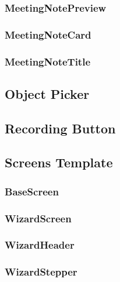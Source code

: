\subsubsection*{MeetingNotePreview}
\label{subsubsec:meeting-note-preview}

\subsubsection*{MeetingNoteCard}
\label{subsubsec:meeting-note-card}

\subsubsection*{MeetingNoteTitle}
\label{subsubsec:meeting-note-title}

\subsection{Object Picker}
\label{subsec:object-picker}

\subsection{Recording Button}
\label{subsec:recording-button}

\subsection{Screens Template}
\label{subsec:screens-template}

\subsubsection*{BaseScreen}
\label{subsubsec:base-screen}

\subsubsection*{WizardScreen}
\label{subsubsec:wizard-screen}

\subsubsection*{WizardHeader}
\label{subsubsec:wizard-header}

\subsubsection*{WizardStepper}
\label{subsubsec:wizard-stepper}

